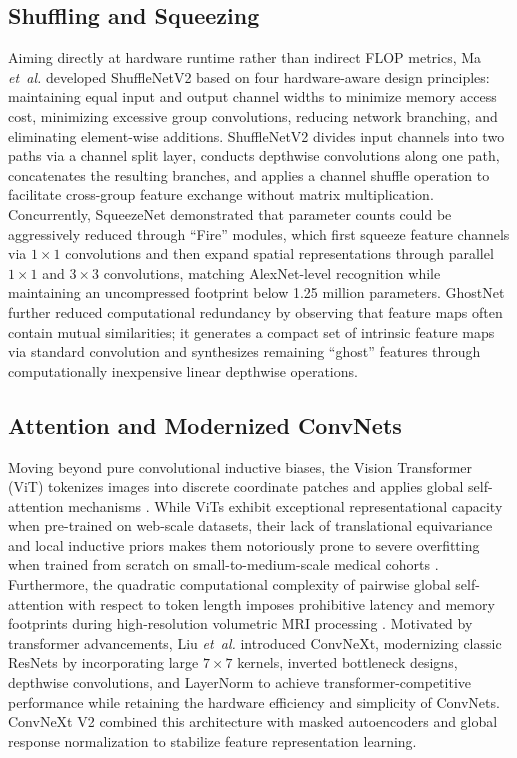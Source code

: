 ﻿\documentclass[journal]{IEEEtran}
\begin{document}
\subsection{Shuffling and Squeezing}
Aiming directly at hardware runtime rather than indirect FLOP metrics, Ma \emph{et~al.} \cite{32} developed ShuffleNetV2 based on four hardware-aware design principles: maintaining equal input and output channel widths to minimize memory access cost, minimizing excessive group convolutions, reducing network branching, and eliminating element-wise additions. ShuffleNetV2 divides input channels into two paths via a channel split layer, conducts depthwise convolutions along one path, concatenates the resulting branches, and applies a channel shuffle operation to facilitate cross-group feature exchange without matrix multiplication. Concurrently, SqueezeNet \cite{17} demonstrated that parameter counts could be aggressively reduced through ``Fire'' modules, which first squeeze feature channels via $1\times1$ convolutions and then expand spatial representations through parallel $1\times1$ and $3\times3$ convolutions, matching AlexNet-level recognition while maintaining an uncompressed footprint below 1.25 million parameters. GhostNet \cite{13} further reduced computational redundancy by observing that feature maps often contain mutual similarities; it generates a compact set of intrinsic feature maps via standard convolution and synthesizes remaining ``ghost'' features through computationally inexpensive linear depthwise operations.

\subsection{Attention and Modernized ConvNets}
Moving beyond pure convolutional inductive biases, the Vision Transformer (ViT) \cite{8} tokenizes images into discrete coordinate patches and applies global self-attention mechanisms \cite{43}. While ViTs exhibit exceptional representational capacity when pre-trained on web-scale datasets, their lack of translational equivariance and local inductive priors makes them notoriously prone to severe overfitting when trained from scratch on small-to-medium-scale medical cohorts \cite{24}. Furthermore, the quadratic computational complexity of pairwise global self-attention with respect to token length imposes prohibitive latency and memory footprints during high-resolution volumetric MRI processing \cite{26}. Motivated by transformer advancements, Liu \emph{et~al.} \cite{30} introduced ConvNeXt, modernizing classic ResNets by incorporating large $7\times7$ kernels, inverted bottleneck designs, depthwise convolutions, and LayerNorm to achieve transformer-competitive performance while retaining the hardware efficiency and simplicity of ConvNets. ConvNeXt V2 \cite{46} combined this architecture with masked autoencoders and global response normalization to stabilize feature representation learning.
\end{document}
